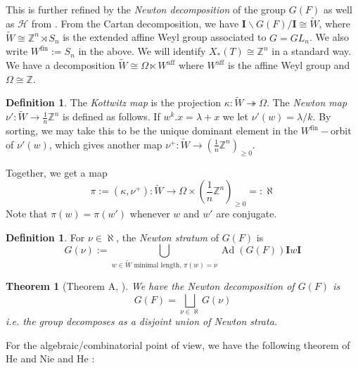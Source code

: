 \documentclass{amsart}
\numberwithin{equation}{section}
\newtheorem{theorem}[lemma]{Theorem}%
\theoremstyle{definition}
\newtheorem{definition}[lemma]{Definition}%
\def\tr{{\rm tr}}
\def\tilde{\widetilde}
\DeclareMathOperator{\Ad}{Ad}
\newcommand{\tW}{\widetilde{W}}
\newcommand{\cH}{\mathcal{H}}
\newcommand{\bI}{\mathbf{I}}
\newcommand{\Z}{{\mathbb Z}}
\newcommand{\aff}{\mathrm{aff}}
\begin{document}
This is further refined by the {\em Newton decomposition} of the group $G(F)$ as well as $\cH$ from \cite{HeCocenter}. From the Cartan decomposition, we have $\bI\backslash G(F)/\bI\cong\tilde{W}$, where $\tilde{W}\cong\Z^n\rtimes S_n$ is the extended affine Weyl group associated to $G=GL_n$. We also write $W^{\mathrm{fin}}:=S_n$ in the above. We will identify $X_*(T)\cong \Z^n$ in a standard way.
We have a decomposition $\tW\cong \Omega\ltimes W^{\aff}$ where $W^{\aff}$ is the affine Weyl group and $\Omega\cong \Z$.
\begin{definition}
    The {\em Kottwitz map} is the projection $\kappa:\tilde{W}\twoheadrightarrow\Omega$.
    The {\em Newton map} $\nu': \tW\to \frac{1}{n}\Z^{n}$ is defined as follows. If $w^k.x=\lambda+x$ we let 
    $\nu'(w)=\lambda/k$. By sorting, we may take this to be the unique dominant element in the $W^{\mathrm{fin}}-$orbit of $\nu'(w)$, which gives another map $\nu^+:\tW\to (\frac{1}{n}\Z^n)_{\ge 0}$.

    Together, we get a map $$\pi:=(\kappa,\nu^+): \tW\to \Omega\times (\frac{1}{n}\Z^n)_{\ge 0}=:\aleph$$
    Note that $\pi(w)=\pi(w')$ whenever $w$ and $w'$ are conjugate.
\end{definition}
\begin{definition}
    For $\nu\in\aleph$, the {\em Newton stratum} of $G(F)$ is $$G(\nu):=\bigcup_{w\in \tW \text{ minimal length, } \pi(w)=\nu} \Ad(G(F))\bI w\bI$$
\end{definition}
\begin{theorem}[Theorem A, \cite{HeCocenter}]
\label{thm:groupnewton}
    We have the {\em Newton decomposition of $G(F)$} is $$G(F)=\bigsqcup_{\nu\in \aleph} G(\nu)$$ i.e. the group decomposes as a disjoint union of Newton strata.
\end{theorem}
For the algebraic/combinatorial point of view, we have the following theorem of He and Nie \cite[Thm. 6.7]{HN14} and He \cite[Thm. 11]{HeCocenter}:
\end{document}
